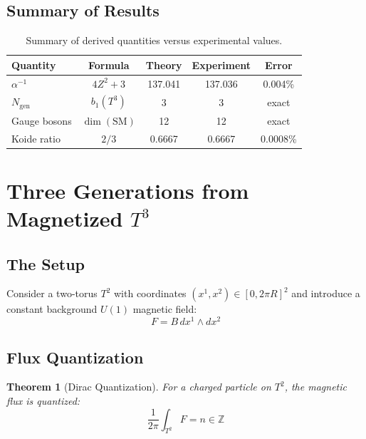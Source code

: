 \documentclass[12pt,a4paper]{article}
\newtheorem{theorem}{Theorem}[section]
\theoremstyle{definition}
\theoremstyle{remark}
\newcommand{\Ngen}{N_{\mathrm{gen}}}
\newcommand{\Stwo}{T^2}
\begin{document}
\subsection{Summary of Results}

\begin{table}[h]
\centering
\begin{tabular}{lcccc}
\toprule
\textbf{Quantity} & \textbf{Formula} & \textbf{Theory} & \textbf{Experiment} & \textbf{Error} \\
\midrule
$\alpha^{-1}$ & $4Z^2 + 3$ & 137.041 & 137.036 & 0.004\% \\
$\Ngen$ & $b_1(T^3)$ & 3 & 3 & exact \\
Gauge bosons & $\dim(\mathrm{SM})$ & 12 & 12 & exact \\
Koide ratio & $2/3$ & 0.6667 & 0.6667 & 0.0008\% \\
\bottomrule
\end{tabular}
\caption{Summary of derived quantities versus experimental values.}
\label{tab:summary}
\end{table}

\section{Three Generations from Magnetized $T^3$}
\label{sec:generations}

\subsection{The Setup}

Consider a two-torus $\Stwo$ with coordinates $(x^1, x^2) \in [0, 2\pi R]^2$ and introduce a constant background $U(1)$ magnetic field:
\begin{equation}
F = B \, dx^1 \wedge dx^2
\end{equation}

\subsection{Flux Quantization}

\begin{theorem}[Dirac Quantization]
For a charged particle on $\Stwo$, the magnetic flux is quantized:
\begin{equation}
\frac{1}{2\pi} \int_{\Stwo} F = n \in \mathbb{Z}
\end{equation}
\end{theorem}
\end{document}
